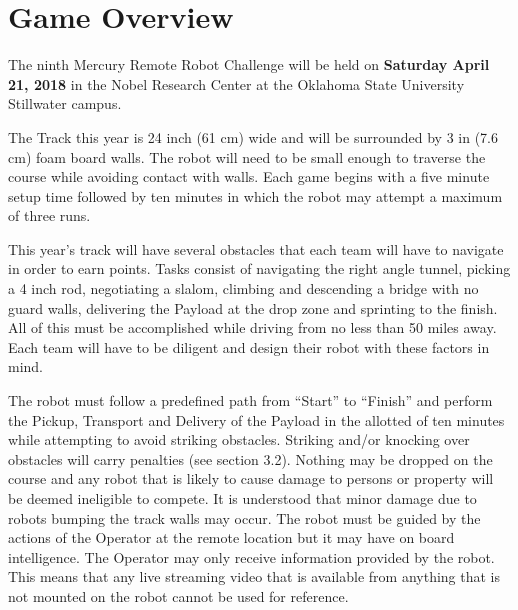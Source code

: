 \section{Game Overview}
The ninth Mercury Remote Robot Challenge will be held on \textbf{Saturday April 21, 2018} in the Nobel Research Center at the Oklahoma State University Stillwater campus.

The Track this year is 24 inch (61 cm) wide and will be surrounded by 3 in (7.6 cm) foam board walls. The robot will need to be small enough to traverse the course while avoiding contact with walls. Each game begins with a five minute setup time followed by ten minutes in which the robot may attempt a maximum of three runs.

This year’s track will have several obstacles that each team will have to navigate in order to earn points. Tasks consist of navigating the right angle tunnel, picking a 4 inch rod, negotiating a slalom, climbing and descending a bridge with no guard walls, delivering the Payload at the drop zone and sprinting to the finish. All of this must be accomplished while driving from no less than 50 miles away. Each team will have to be diligent and design their robot with these factors in mind. 

The robot must follow a predefined path from “Start” to “Finish” and perform the Pickup, Transport and Delivery of the Payload in the allotted of ten minutes while attempting to avoid striking obstacles. Striking and/or knocking over obstacles will carry penalties (see section 3.2). Nothing may be dropped on the course and any robot that is likely to cause damage to persons or property will be deemed ineligible to compete. It is understood that minor damage due to robots bumping the track walls may occur. The robot must be guided by the actions of the Operator at the remote location but it may have on board intelligence. The Operator may only receive information provided by the robot. This means that any live streaming video that is available from anything that is not mounted on the robot cannot be used for reference.